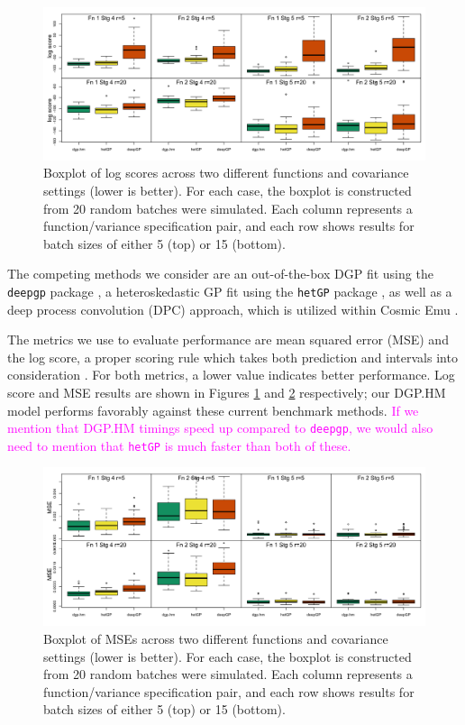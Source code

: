 \documentclass[11pt]{article}
\begin{document}
\begin{figure}[t]
    \centering
    \includegraphics[width=6in]{sims_logS.png}
    \caption{Boxplot of log scores across two different functions and covariance 
             settings (lower is better). For each case, the boxplot is constructed 
             from 20 random batches were simulated. Each column represents a function/variance 
             specification pair, and each row shows results for batch sizes of either 
             5 (top) or 15 (bottom).}
    \label{fig:sims_logS}
\end{figure}

The competing methods we consider are an out-of-the-box DGP fit using the 
\texttt{deepgp} package \citep{sauer2023active}, a heteroskedastic GP fit using 
the \texttt{hetGP} package \citep{binois2018practical, binois2021hetgp}, as well 
as a deep process convolution (DPC) approach, which is utilized within Cosmic 
Emu \citep{moran2023mira}. 

The metrics we use to evaluate performance are mean squared error (MSE) and the 
log score, a proper scoring rule which takes both prediction and intervals into 
consideration \citep{gneiting2007strictly}. For both metrics, a lower value indicates 
better performance. Log score and MSE results are shown in Figures \ref{fig:sims_logS} 
and \ref{fig:sims_MSE} respectively; our DGP.HM model performs favorably against 
these current benchmark methods. \textcolor{magenta}{If we mention that DGP.HM timings 
speed up compared to \texttt{deepgp}, we would also need to mention that \texttt{hetGP} 
is much faster than both of these.}

\begin{figure}
    \centering
    \includegraphics[width=6in]{sims_MSE.png}
    \caption{Boxplot of MSEs across two different functions and covariance settings 
             (lower is better). For each case, the boxplot is constructed from 20 
             random batches were simulated. Each column represents a function/variance 
             specification pair, and each row shows results for batch sizes of 
             either 5 (top) or 15 (bottom).}    
    \label{fig:sims_MSE}
\end{figure}
\end{document}
